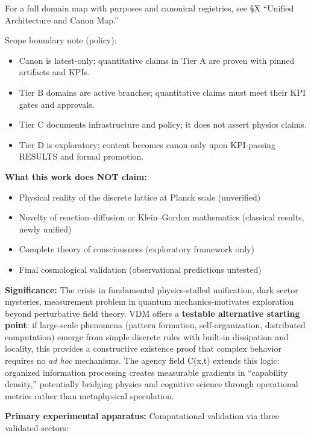 \documentclass[
]{article}
\providecommand{\tightlist}{%
  \setlength{\itemsep}{0pt}\setlength{\parskip}{0pt}}
\begin{document}
For a full domain map with purposes and canonical registries, see §X
``Unified Architecture and Canon Map.''

Scope boundary note (policy):

\begin{itemize}
\tightlist
\item
  Canon is latest-only; quantitative claims in Tier A are proven with
  pinned artifacts and KPIs.
\item
  Tier B domains are active branches; quantitative claims must meet
  their KPI gates and approvals.
\item
  Tier C documents infrastructure and policy; it does not assert physics
  claims.
\item
  Tier D is exploratory; content becomes canon only upon KPI-passing
  RESULTS and formal promotion.
\end{itemize}

\textbf{What this work does NOT claim:}

\begin{itemize}
\tightlist
\item
  Physical reality of the discrete lattice at Planck scale (unverified)
\item
  Novelty of reaction--diffusion or Klein--Gordon mathematics (classical
  results, newly unified)
\item
  Complete theory of consciousness (exploratory framework only)
\item
  Final cosmological validation (observational predictions untested)
\end{itemize}

\textbf{Significance:} The crisis in fundamental physics-stalled
unification, dark sector mysteries, measurement problem in quantum
mechanics-motivates exploration beyond perturbative field theory. VDM
offers a \textbf{testable alternative starting point}: if large-scale
phenomena (pattern formation, self-organization, distributed
computation) emerge from simple discrete rules with built-in dissipation
and locality, this provides a constructive existence proof that complex
behavior requires no \emph{ad hoc} mechanisms. The agency field C(x,t)
extends this logic: organized information processing creates measurable
gradients in ``capability density,'' potentially bridging physics and
cognitive science through operational metrics rather than metaphysical
speculation.

\textbf{Primary experimental apparatus:} Computational validation via
three validated sectors:
\end{document}
